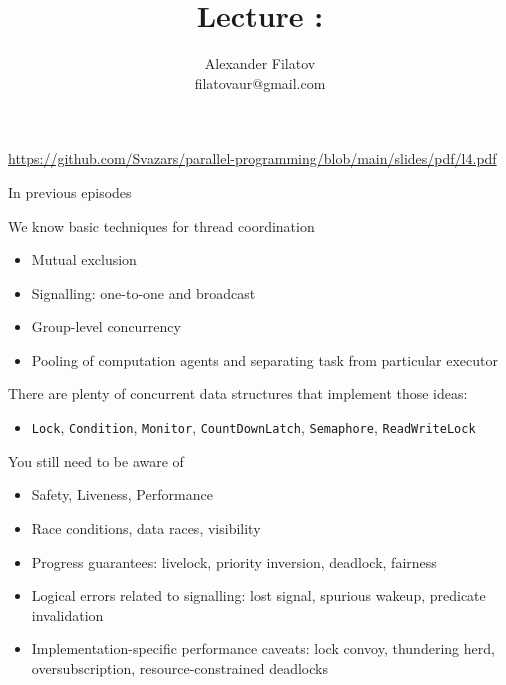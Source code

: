 


\title[]{Lecture \patternsNum: \patternsTopic}
\subtitle[]{\patternsKey}
\author[]{Alexander Filatov\\ filatovaur@gmail.com}

\date{}

\newcommand{\taskCheckInterruptible}{4.1}




\begin{frame}
  \titlepage
  \url{https://github.com/Svazars/parallel-programming/blob/main/slides/pdf/l4.pdf}
\end{frame}

\begin{frame}{In previous episodes}

We know basic techniques for thread coordination
\begin{itemize}
    \item Mutual exclusion
    \item Signalling: one-to-one and broadcast
    \item Group-level concurrency
    \item Pooling of computation agents and separating task from particular executor
\end{itemize}

There are plenty of concurrent data structures that implement those ideas:
\begin{itemize}
    \item \texttt{Lock}, \texttt{Condition}, \texttt{Monitor}, \texttt{CountDownLatch}, \texttt{Semaphore}, \texttt{ReadWriteLock}
\end{itemize}

You still need to be aware of
\begin{itemize}
    \item Safety, Liveness, Performance
    \item Race conditions, data races, visibility
    \item Progress guarantees: livelock, priority inversion, deadlock, fairness
    \item Logical errors related to signalling: lost signal, spurious wakeup, predicate invalidation
    \item Implementation-specific performance caveats: lock convoy, thundering herd, oversubscription, resource-constrained deadlocks 
\end{itemize}
\end{frame}

